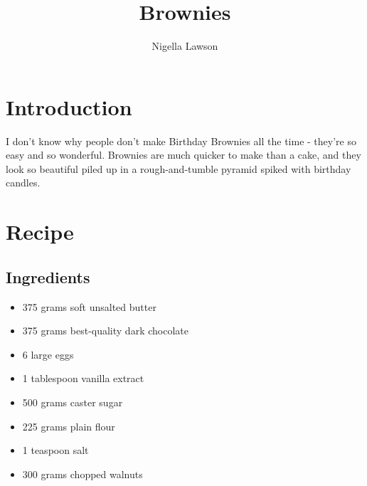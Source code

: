 \documentclass{article}
\author{Nigella Lawson}
\title{Brownies}
\begin{document}
    \maketitle   
    \section{Introduction}
        I don't know why people don't make Birthday Brownies all the time - they're so easy and so wonderful. Brownies are much quicker to make than a cake, and they look so beautiful piled up in a rough-and-tumble pyramid spiked with birthday candles.
    \section{Recipe}
        \subsection{Ingredients}    
        \begin{itemize}        
           \item 375 grams soft unsalted butter
           \item  375 grams best-quality dark chocolate
           \item 6 large eggs
           \item 1 tablespoon vanilla extract
           \item 500 grams caster sugar
           \item 225 grams plain flour
           \item 1 teaspoon salt
           \item 300 grams chopped walnuts
        \end{itemize}
\end{document}

